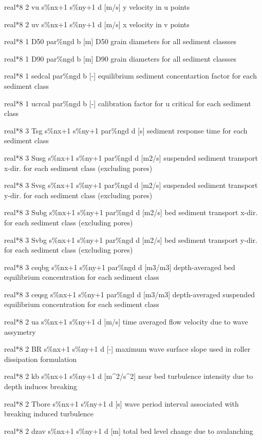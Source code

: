 real*8  2  vu     s\%nx+1 s\%ny+1 d  [m/s]      y velocity in u points          

real*8  2  uv     s\%nx+1 s\%ny+1 d  [m/s]          x velocity in v points

real*8  1  D50    par\%ngd b  [m]        D50 grain diameters for all sediment classses

real*8  1  D90    par\%ngd b  [m]        D90 grain diameters for all sediment classses

real*8  1  sedcal par\%ngd b  [-]        equilibrium sediment concentartion factor for each sediment class

real*8  1  ucrcal par\%ngd b  [-]        calibration factor for u critical for each sediment class

real*8  3  Tsg    s\%nx+1 s\%ny+1 par\%ngd d  [s]        sediment response time for each sediment class

real*8  3  Susg    s\%nx+1 s\%ny+1 par\%ngd d  [m2/s]    suspended sediment transport x-dir. for each sediment class (excluding pores)

real*8  3  Svsg    s\%nx+1 s\%ny+1 par\%ngd d  [m2/s]    suspended sediment transport y-dir. for each sediment class (excluding pores)

real*8  3  Subg    s\%nx+1 s\%ny+1 par\%ngd d  [m2/s]    bed sediment transport x-dir. for each sediment class (excluding pores)

real*8  3  Svbg    s\%nx+1 s\%ny+1 par\%ngd d  [m2/s]    bed sediment transport y-dir. for each sediment class (excluding pores)

real*8  3  ceqbg s\%nx+1 s\%ny+1 par\%ngd d  [m3/m3]    depth-averaged bed equilibrium concentration for each sediment class

real*8  3  ceqsg s\%nx+1 s\%ny+1 par\%ngd d  [m3/m3]    depth-averaged suspended equilibrium concentration for each sediment class

real*8  2  ua     s\%nx+1 s\%ny+1 d  [m/s]      time averaged flow velocity due to wave assymetry

real*8  2  BR     s\%nx+1 s\%ny+1 d  [-]        maximum wave surface slope used in roller dissipation formulation

real*8  2  kb s\%nx+1 s\%ny+1 d  [m\^{}2/s\^{}2]  near bed turbulence intensity due to depth induces breaking

real*8  2  Tbore s\%nx+1 s\%ny+1 d  [s]        wave period interval associated with breaking induced turbulence

real*8  2  dzav   s\%nx+1 s\%ny+1 d  [m]        total bed level change due to avalanching

